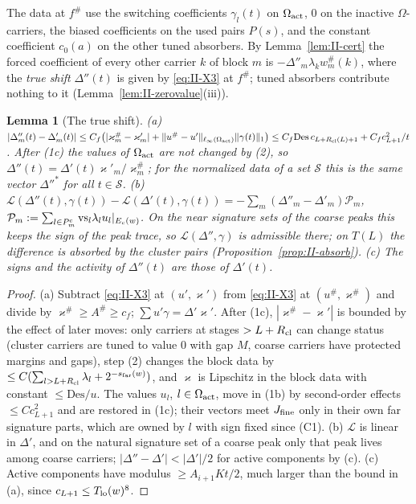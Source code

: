 \documentclass[10pt]{amsart}
\newtheorem{lemma}[theorem]{Lemma}
\theoremstyle{definition}
\theoremstyle{remark}
\begin{document}
The data at $f^\#$ use the switching coefficients $\gamma_l(t)$ on $\Omega_{\rm act}$,
$0$ on the inactive $\Omega$-carriers, the biased coefficients on the used pairs
$P(s)$, and the constant coefficient $c_0(a)$ on the other tuned absorbers.  By
Lemma~\ref{lem:II-cert} the forced coefficient of every other carrier $k$ of
block $m$ is $-\Delta''_m\lambda_kw^\#_m(k)$, where the \emph{true shift} $\Delta''(t)$ is given
by \eqref{eq:II-X3} at $f^\#$; tuned absorbers contribute nothing to it
(Lemma~\ref{lem:II-zerovalue}(iii)).

\begin{lemma}[The true shift]\label{lem:II-trueshift}
\textup{(a)} $|\Delta''_m(t)-\Delta'_m(t)|\le C_f\big(|\varkappa^\#_m-\varkappa'_m|+\|u^\#-u'\|_{\ell_\infty
(\Omega_{\rm act})}\|\gamma(t)\|_1\big)\le C_f\mathrm{Des}\,c_{L+R_{\rm cl}(L)+1}+C_fc_{L+1}^2/t$.  After
\textup{(1c)} the values of $\Omega_{\rm act}$ are not changed by \textup{(2)}, so
$\Delta''(t)=\Delta'(t)\varkappa'_m/\varkappa^\#_m$; for the normalized data of a set $\mathcal S$
this is the same vector $\Delta''^*$ for all $t\in\mathcal S$.
\textup{(b)} $\mathcal L(\Delta''(t),\gamma(t))-\mathcal L(\Delta'(t),\gamma(t))=-\sum_m(\Delta''_m-\Delta'_m)
\mathcal P_m$, $\mathcal P_m:=\sum_{l\in P^{\rm c}_m}\mathrm{vs}_l\lambda_lu_l|_{E_c(w)}$.  On the near
signature sets of the coarse peaks this keeps the sign of the peak trace, so
$\mathcal L(\Delta'',\gamma)$ is admissible there; on $T(L)$ the difference is absorbed by
the cluster pairs (Proposition~\ref{prop:II-absorb}).
\textup{(c)} The signs and the activity of $\Delta''(t)$ are those of $\Delta'(t)$.
\end{lemma}

\begin{proof}
(a) Subtract \eqref{eq:II-X3} at $(u',\varkappa')$ from \eqref{eq:II-X3} at $(u^\#,\varkappa^\#)$ and
divide by $\varkappa^\#\ge A^\#\ge c_f$; $\sum u'\gamma=\Delta'\varkappa'$.  After (1c), $|\varkappa^\#-\varkappa'|$
is bounded by the effect of later moves: only carriers at stages $>L+R_{\rm cl}$ can
change status (cluster carriers are tuned to value $0$ with gap $M$, coarse
carriers have protected margins and gaps), step (2) changes the block data by
$\le C(\sum_{l>L+R_{\rm cl}}\lambda_l+2^{-s_{\rm far}(w)})$, and $\varkappa$ is Lipschitz in the
block data with constant $\le\mathrm{Des}/u$.  The values $u_l$, $l\in\Omega_{\rm act}$, move in
(1b) by second-order effects $\le Cc_{L+1}^2$ and are restored in (1c); their
vectors meet $J_{\rm fine}$ only in their own far signature parts, which are owned
by $l$ with sign fixed since (C1).  (b) $\mathcal L$ is linear in $\Delta'$, and on the
natural signature set of a coarse peak only that peak lives among coarse
carriers; $|\Delta''-\Delta'|<|\Delta'|/2$ for active components by (c).  (c) Active
components have modulus $\ge A_{i+1}Kt/2$, much larger than the bound in (a),
since $c_{L+1}\le T_{\rm lo}(w)^8$.
\end{proof}
\end{document}
